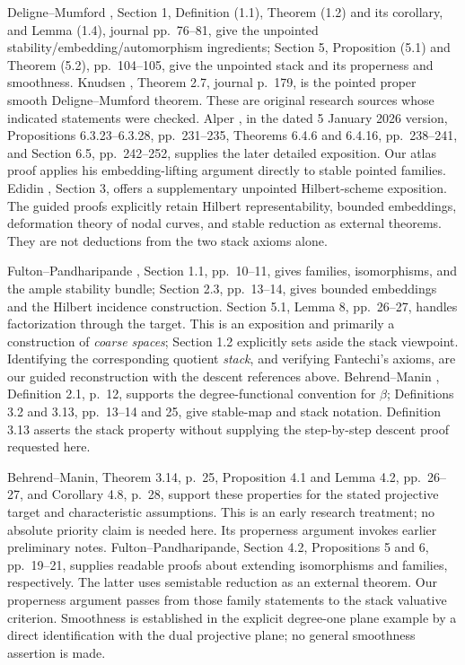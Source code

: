 \begin{description}[style=nextline]
\item[Stable curves, embeddings, and geometric properties.]
Deligne--Mumford \cite{DM}, Section 1, Definition (1.1),
Theorem (1.2) and its corollary, and Lemma (1.4), journal pp.~76--81,
give the unpointed stability/embedding/automorphism ingredients;
Section 5, Proposition (5.1) and Theorem (5.2), pp.~104--105, give
the unpointed stack and its properness and smoothness.
Knudsen \cite{Knudsen}, Theorem 2.7, journal p.~179, is the pointed
proper smooth Deligne--Mumford theorem.
These are original research sources whose indicated statements were
checked. Alper \cite{Alper}, in the dated 5 January 2026 version,
Propositions 6.3.23--6.3.28, pp.~231--235,
Theorems 6.4.6 and 6.4.16, pp.~238--241, and
Section 6.5, pp.~242--252, supplies the later detailed exposition.
Our atlas proof applies his embedding-lifting argument directly
to stable pointed families. Edidin \cite{Edidin}, Section 3,
offers a supplementary unpointed Hilbert-scheme exposition.
The guided proofs explicitly retain Hilbert
representability, bounded embeddings, deformation theory of nodal
curves, and stable reduction as external theorems. They are not
deductions from the two stack axioms alone.

\item[Stable maps: definitions and bounded parameter spaces.]
Fulton--Pandharipande \cite{FP}, Section 1.1, pp.~10--11, gives
families, isomorphisms, and the ample stability bundle;
Section 2.3, pp.~13--14, gives bounded embeddings and the Hilbert
incidence construction. Section 5.1, Lemma 8, pp.~26--27, handles
factorization through the target. This is an exposition and primarily
a construction of \emph{coarse spaces}; Section 1.2 explicitly sets
aside the stack viewpoint. Identifying the corresponding quotient
\emph{stack}, and verifying Fantechi's axioms, are our guided
reconstruction with the descent references above.
Behrend--Manin \cite{BM}, Definition 2.1, p.~12, supports the
degree-functional convention for $\beta$; Definitions 3.2 and 3.13,
pp.~13--14 and 25, give stable-map and stack notation.
Definition 3.13 asserts the stack property without supplying the
step-by-step descent proof requested here.

\item[Stable maps: Deligne--Mumford, finite type, and properness.]
Behrend--Manin, Theorem 3.14, p.~25, Proposition 4.1 and
Lemma 4.2, pp.~26--27, and Corollary 4.8, p.~28, support these
properties for the stated projective target and characteristic
assumptions. This is an early research treatment; no absolute
priority claim is needed here. Its properness argument invokes
earlier preliminary notes. Fulton--Pandharipande, Section 4.2,
Propositions 5 and 6, pp.~19--21, supplies readable proofs about
extending isomorphisms and families, respectively. The latter
uses semistable reduction as an external theorem.
Our properness argument passes from those family statements to
the stack valuative criterion. Smoothness is established in the
explicit degree-one plane example by a direct identification with
the dual projective plane; no general smoothness assertion is made.
\end{description}

